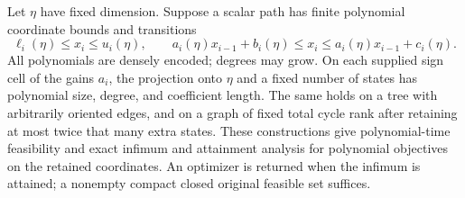 \begin{theorem}
\label{s5:strip}
Let $\eta$ have fixed dimension. Suppose a scalar path has finite
polynomial coordinate bounds and transitions
\[
 \ell_i(\eta)\le x_i\le u_i(\eta),\qquad
 a_i(\eta)x_{i-1}+b_i(\eta)\le x_i
 \le a_i(\eta)x_{i-1}+c_i(\eta).
\]
All polynomials are densely encoded; degrees may grow. On each supplied
sign cell of the gains $a_i$, the projection onto $\eta$ and a fixed
number of states has polynomial size, degree, and coefficient length.
The same holds on a tree with arbitrarily oriented edges, and on a graph
of fixed total cycle rank after retaining at most twice that many extra
states. These constructions give polynomial-time feasibility and exact
infimum and attainment analysis for polynomial objectives on the
retained coordinates. An optimizer is returned when the infimum is
attained; a nonempty compact closed original feasible set suffices.
\end{theorem}
